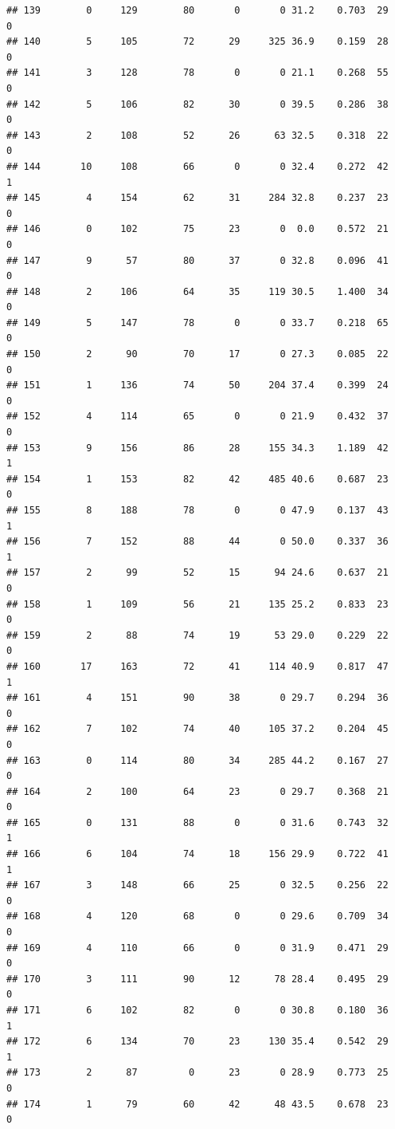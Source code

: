 \documentclass[11pt, a4paper]{article}\usepackage[]{graphicx}\usepackage[]{xcolor}
\makeatletter
\newenvironment{kframe}{%
 \def\at@end@of@kframe{}%
 \ifinner\ifhmode%
  \def\at@end@of@kframe{\end{minipage}}%
  \begin{minipage}{\columnwidth}%
 \fi\fi%
 \def\FrameCommand##1{\hskip\@totalleftmargin \hskip-\fboxsep
 \colorbox{shadecolor}{##1}\hskip-\fboxsep
     \hskip-\linewidth \hskip-\@totalleftmargin \hskip\columnwidth}%
 \MakeFramed {\advance\hsize-\width
   \@totalleftmargin\z@ \linewidth\hsize
   \@setminipage}}%
 {\par\unskip\endMakeFramed%
 \at@end@of@kframe}
\newenvironment{knitrout}{}{} %
\makeatother
\begin{document}
\begin{knitrout}
\begin{kframe}
\begin{verbatim}
## 139        0     129        80       0       0 31.2    0.703  29    0
## 140        5     105        72      29     325 36.9    0.159  28    0
## 141        3     128        78       0       0 21.1    0.268  55    0
## 142        5     106        82      30       0 39.5    0.286  38    0
## 143        2     108        52      26      63 32.5    0.318  22    0
## 144       10     108        66       0       0 32.4    0.272  42    1
## 145        4     154        62      31     284 32.8    0.237  23    0
## 146        0     102        75      23       0  0.0    0.572  21    0
## 147        9      57        80      37       0 32.8    0.096  41    0
## 148        2     106        64      35     119 30.5    1.400  34    0
## 149        5     147        78       0       0 33.7    0.218  65    0
## 150        2      90        70      17       0 27.3    0.085  22    0
## 151        1     136        74      50     204 37.4    0.399  24    0
## 152        4     114        65       0       0 21.9    0.432  37    0
## 153        9     156        86      28     155 34.3    1.189  42    1
## 154        1     153        82      42     485 40.6    0.687  23    0
## 155        8     188        78       0       0 47.9    0.137  43    1
## 156        7     152        88      44       0 50.0    0.337  36    1
## 157        2      99        52      15      94 24.6    0.637  21    0
## 158        1     109        56      21     135 25.2    0.833  23    0
## 159        2      88        74      19      53 29.0    0.229  22    0
## 160       17     163        72      41     114 40.9    0.817  47    1
## 161        4     151        90      38       0 29.7    0.294  36    0
## 162        7     102        74      40     105 37.2    0.204  45    0
## 163        0     114        80      34     285 44.2    0.167  27    0
## 164        2     100        64      23       0 29.7    0.368  21    0
## 165        0     131        88       0       0 31.6    0.743  32    1
## 166        6     104        74      18     156 29.9    0.722  41    1
## 167        3     148        66      25       0 32.5    0.256  22    0
## 168        4     120        68       0       0 29.6    0.709  34    0
## 169        4     110        66       0       0 31.9    0.471  29    0
## 170        3     111        90      12      78 28.4    0.495  29    0
## 171        6     102        82       0       0 30.8    0.180  36    1
## 172        6     134        70      23     130 35.4    0.542  29    1
## 173        2      87         0      23       0 28.9    0.773  25    0
## 174        1      79        60      42      48 43.5    0.678  23    0

\end{verbatim}
\end{kframe}
\end{knitrout}
\end{document}
